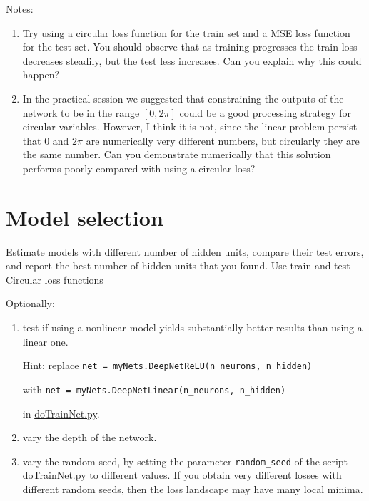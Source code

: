 \documentclass[12pt]{article}
\begin{document}
Notes:

\begin{enumerate}

    \item Try using a circular loss function for the train set and a MSE loss
        function for the test set. You should observe that as training
        progresses the train loss decreases steadily, but the test less
        increases. Can you explain why this could happen?

    \item In the practical session we suggested that constraining the outputs
        of the network to be in the range $[0, 2\pi]$ could be a good
        processing strategy for circular variables. However, I think it is not,
        since the linear problem persist that 0 and $2\pi$ are numerically very
        different numbers, but circularly they are the same number. Can you
        demonstrate numerically that this solution performs poorly compared
        with using a circular loss?

\end{enumerate}

\section{Model selection}

Estimate models with different number of hidden units, compare their test
errors, and report the best number of hidden units that you found. Use train and
test Circular loss functions

Optionally:

\begin{enumerate}

    \item test if using a nonlinear model yields substantially better results
        than using a linear one.

        Hint: replace \texttt{net =
        myNets.DeepNetReLU(n\_neurons, n\_hidden)}

        with \texttt{net = myNets.DeepNetLinear(n\_neurons, n\_hidden)}

        in
        \href{https://github.com/joacorapela/statNeuro2025/blob/master/worksheets/08_artificialNeuralNetworks/code/scripts/doTrainNet.py}{doTrainNet.py}.

    \item vary the depth of the network.

    \item vary the random seed, by setting the parameter \texttt{random\_seed}
        of the script
        \href{https://github.com/joacorapela/statNeuro2025/blob/master/worksheets/08_artificialNeuralNetworks/code/scripts/doTrainNet.py}{doTrainNet.py}
        to different values. If you obtain very different losses with different
        random seeds, then the loss landscape may have many local minima.

\end{enumerate}
\end{document}
